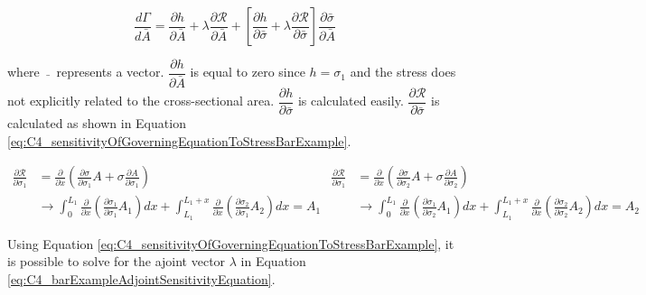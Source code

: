 \begin{equation}\label{eq:C4_barExampleAdjointSensitivityEquation}
	\frac{d\Gamma}{d \bar{A}} = 
	\frac{\partial h}{\partial \bar{A}} + \lambda \frac{\partial \mathcal{R}}{\partial \bar{A}} + 
	\left[
	\frac{\partial h}{\partial \bar{\sigma}} + \lambda \frac{\partial \mathcal{R}}{\partial \bar{\sigma}}
	\right]
	\frac{\partial \bar{\sigma}}{\partial \bar{A}}
\end{equation}

where $\bar{\text{ }}$ represents a vector. $\dfrac{\partial h}{\partial \bar{A}}$ is equal to zero since $h = \sigma_1$ and the stress does not explicitly related to the cross-sectional area. $\dfrac{\partial h}{\partial \bar{\sigma}}$ is calculated easily. $\dfrac{\partial \mathcal{R}}{\partial \bar{\sigma}}$ is calculated as shown in Equation \eqref{eq:C4_sensitivityOfGoverningEquationToStressBarExample}.

\begin{subequations}\label{eq:C4_sensitivityOfGoverningEquationToStressBarExample}
\begin{align}
	\frac{\partial \mathcal{R}}{\partial \sigma_1} &= 
	\frac{\partial }{\partial x}
	\left(
	\frac{\partial \sigma}{\partial \sigma_1} A + \sigma \frac{\partial A}{\partial \sigma_1}
	\right) \nonumber \\
	&\rightarrow
	\int_0^{L_1}
	\frac{\partial}{\partial x}
	\left(
	\frac{\partial \sigma_1}{\partial \sigma_1} A_1
	\right) dx + 
	\int_{L_1}^{L_1 + x}
	\frac{\partial}{\partial x}
	\left(
	\frac{\partial \sigma_2}{\partial \sigma_1} A_2
	\right) dx = A_1
\end{align}
\begin{align}
	\frac{\partial \mathcal{R}}{\partial \sigma_1} &= 
	\frac{\partial }{\partial x}
	\left(
	\frac{\partial \sigma}{\partial \sigma_2} A + \sigma \frac{\partial A}{\partial \sigma_2}
	\right) \nonumber \\
	&\rightarrow
	\int_0^{L_1}
	\frac{\partial}{\partial x}
	\left(
	\frac{\partial \sigma_1}{\partial \sigma_2} A_1
	\right) dx + 
	\int_{L_1}^{L_1 + x}
	\frac{\partial}{\partial x}
	\left(
	\frac{\partial \sigma_2}{\partial \sigma_2} A_2
	\right) dx = A_2
\end{align}
\end{subequations}

Using Equation \eqref{eq:C4_sensitivityOfGoverningEquationToStressBarExample}, it is possible to solve for the ajoint vector $\lambda$ in Equation \eqref{eq:C4_barExampleAdjointSensitivityEquation}.

